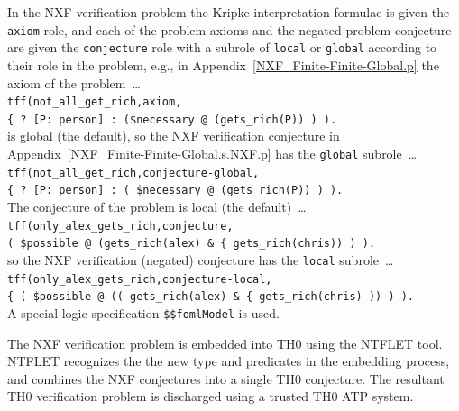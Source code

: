 \documentclass{easychair}
\newcommand{\smalltt}[1]{\small \texttt{#1}}
\begin{document}
In the NXF verification problem the Kripke interpretation-formulae is given the {\tt axiom} role,
and each of the problem axioms and the negated problem conjecture are given the {\tt conjecture} 
role with a subrole of {\tt local} or {\tt global} according to their role in the problem, e.g., 
in Appendix~\ref{NXF_Finite-Finite-Global.p} the axiom of the problem~\ldots \\
\hspace*{0.5cm}\smalltt{tff(not\_all\_get\_rich,axiom,} \\
\hspace*{0.8cm}\smalltt{\{{\raisebox{0.4ex}{\texttildelow}} ? [P: person] : ({\$necessary} @ (gets\_rich(P)) ) ).}\\
is global (the default), so the NXF verification conjecture in 
Appendix~\ref{NXF_Finite-Finite-Global.s.NXF.p} has the {\tt global} subrole~\ldots \\
\hspace*{0.5cm}\smalltt{tff(not\_all\_get\_rich,conjecture-global,} \\
\hspace*{0.8cm}\smalltt{\{{\raisebox{0.4ex}{\texttildelow}} ? [P: person] : ( {\$necessary} @ (gets\_rich(P)) ) ).} \\
The conjecture of the problem is local (the default)~\ldots \\
\hspace*{0.5cm}\smalltt{tff(only\_alex\_gets\_rich,conjecture,} \\
\hspace*{0.8cm}\smalltt{( {\$possible} @ (gets\_rich(alex) \& \{{\raisebox{0.4ex}{\texttildelow}} gets\_rich(chris)) ) ).} \\
so the NXF verification (negated) conjecture has the {\tt local} subrole~\ldots \\
\hspace*{0.5cm}\smalltt{tff(only\_alex\_gets\_rich,conjecture-local,} \\
\hspace*{0.8cm}\smalltt{\{{\raisebox{0.4ex}{\texttildelow}} ( {\$possible} @ (( gets\_rich(alex) \& \{{\raisebox{0.4ex}{\texttildelow}} gets\_rich(chris) )) ) ).} \\
A special logic specification {\tt \$\$fomlModel} is used.

The NXF verification problem is embedded into TH0 using the NTFLET tool.
NTFLET recognizes the the new type and predicates in the embedding process, and combines
the NXF conjectures into a single TH0 conjecture.
The resultant TH0 verification problem is discharged using a trusted TH0 ATP system.
\end{document}

